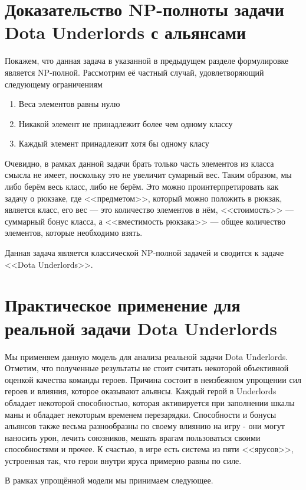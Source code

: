 \documentclass{article}
\begin{document}
\section{Доказательство NP-полноты задачи Dota Underlords с альянсами}

Покажем, что данная задача в указанной в предыдущем разделе формулировке является NP-полной. Рассмотрим её частный случай, удовлетворяющий следующему ограничениям 

\begin{enumerate}
    \item Веса элементов равны нулю
    \item Никакой элемент не принадлежит более чем одному классу
    \item Каждый элемент принадлежит хотя бы одному класу
\end{enumerate}

Очевидно, в рамках данной задачи брать только часть элементов из класса смысла не имеет, поскольку это не увеличит сумарный вес. Таким образом, мы либо берём весь класс, либо не берём. Это можно проинтерпретировать как задачу о рюкзаке, где <<предметом>>, который можно положить в рюкзак, является класс, его вес --- это количество элементов в нём, <<стоимость>> --- суммарный бонус класса, а <<вместимость рюкзака>> --- общее количество элементов, которые необходимо взять.

Данная задача является классической NP-полной задачей и сводится к задаче <<Dota Underlords>>.


\section{Практическое применение для реальной задачи Dota Underlords}
  
Мы применяем данную модель для анализа реальной задачи Dota Underlords. Отметим, что полученные результаты не стоит считать некоторой объективной оценкой качества команды героев. Причина состоит в неизбежном упрощении сил героев и влияния, которое оказывают альянсы. Каждый герой в Underlords обладает некоторой способностью, которая активируется при заполнении шкалы маны и обладает некоторым временем перезарядки. Способности и бонусы альянсов также весьма разнообразны по своему влиянию на игру - они могут наносить урон, лечить союзников, мешать врагам пользоваться своими способностями и прочее. К счастью, в игре есть система из пяти <<ярусов>>, устроенная так, что герои внутри яруса примерно равны по силе.

В рамках упрощённой модели мы принимаем следующее.
\end{document}
